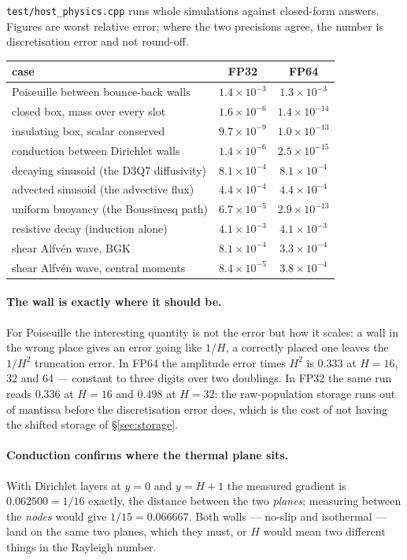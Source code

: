 \documentclass[11pt,a4paper]{article}
\newcommand{\code}[1]{\texttt{\small #1}}
\newcommand{\e}[1]{\times 10^{#1}}
\begin{document}
\code{test/host\_physics.cpp} runs whole simulations against closed-form answers.
Figures are worst relative error; where the two precisions agree, the number is
discretisation error and not round-off.

\begin{center}\small
\begin{tabular}{lcc}
\toprule
case & FP32 & FP64 \\
\midrule
Poiseuille between bounce-back walls      & $1.4\e{-3}$ & $1.3\e{-3}$ \\
closed box, mass over every slot          & $1.6\e{-6}$ & $1.4\e{-14}$ \\
insulating box, scalar conserved          & $9.7\e{-9}$ & $1.0\e{-13}$ \\
conduction between Dirichlet walls        & $1.4\e{-6}$ & $2.5\e{-15}$ \\
decaying sinusoid (the D3Q7 diffusivity)  & $8.1\e{-4}$ & $8.1\e{-4}$ \\
advected sinusoid (the advective flux)    & $4.4\e{-4}$ & $4.4\e{-4}$ \\
uniform buoyancy (the Boussinesq path)    & $6.7\e{-5}$ & $2.9\e{-13}$ \\
resistive decay (induction alone)         & $4.1\e{-3}$ & $4.1\e{-3}$ \\
shear Alfv\'en wave, BGK                  & $8.1\e{-4}$ & $3.3\e{-4}$ \\
shear Alfv\'en wave, central moments      & $8.4\e{-5}$ & $3.8\e{-4}$ \\
\bottomrule
\end{tabular}
\end{center}

\paragraph{The wall is exactly where it should be.} For Poiseuille the
interesting quantity is not the error but how it scales: a wall in the wrong
place gives an error going like $1/H$, a correctly placed one leaves the $1/H^2$
truncation error. In FP64 the amplitude error times $H^2$ is $0.333$ at $H=16$,
$32$ and $64$ --- constant to three digits over two doublings. In FP32 the same
run reads $0.336$ at $H=16$ and $0.498$ at $H=32$: the raw-population storage
runs out of mantissa before the discretisation error does, which is the cost of
not having the shifted storage of \S\ref{sec:storage}.

\paragraph{Conduction confirms where the thermal plane sits.} With Dirichlet
layers at $y=0$ and $y=H+1$ the measured gradient is $0.062500 = 1/16$ exactly,
the distance between the two \emph{planes}; measuring between the \emph{nodes}
would give $1/15 = 0.066667$. Both walls --- no-slip and isothermal --- land on
the same two planes, which they must, or $H$ would mean two different things in
the Rayleigh number.
\end{document}
